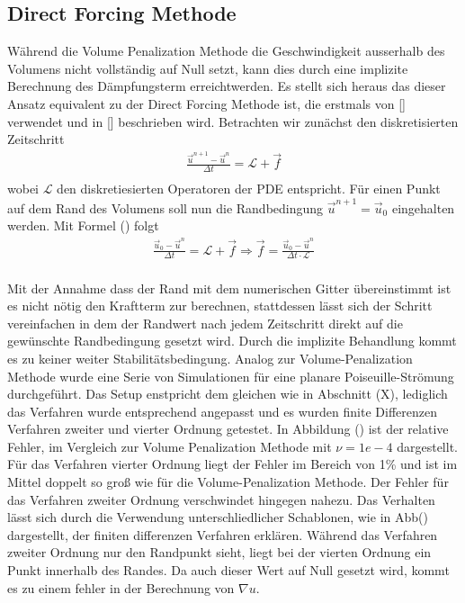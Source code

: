 \subsection{Direct Forcing Methode}
Während die Volume Penalization Methode die Geschwindigkeit ausserhalb des Volumens nicht vollständig auf Null setzt,
 kann dies durch eine implizite Berechnung des Dämpfungsterm erreichtwerden. Es stellt sich heraus das dieser Ansatz equivalent
  zu der Direct Forcing Methode ist, die erstmals von [] verwendet und in [] beschrieben wird.
Betrachten wir zunächst den diskretisierten Zeitschritt
\begin{align}
    \frac{\vec{u}^{n+1} -\vec{u}^n}{\Delta t} = \mathscr{L} + \vec{f}\\
\end{align}
wobei $\mathscr{L}$ den diskretiesierten Operatoren der PDE entspricht.
Für einen Punkt auf dem Rand des Volumens soll nun die Randbedingung $\vec{u}^{n+1} = \vec{u}_0$ eingehalten werden.
Mit Formel () folgt
\begin{align}
    \frac{\vec{u}_0 -\vec{u}^n}{\Delta t} = \mathscr{L} + \vec{f} \Rightarrow \vec{f} = \frac{\vec{u}_0 -\vec{u}^n}{\Delta t\cdot \mathscr{L}}\\
\end{align}

Mit der Annahme dass der Rand mit dem numerischen Gitter übereinstimmt ist es nicht nötig den Kraftterm zur berechnen, stattdessen lässt sich der
Schritt vereinfachen in dem der Randwert nach  jedem Zeitschritt direkt auf die gewünschte Randbedingung gesetzt wird. Durch die
implizite Behandlung kommt es zu keiner weiter Stabilitätsbedingung.
Analog zur Volume-Penalization Methode wurde eine Serie von Simulationen für eine planare Poiseuille-Strömung durchgeführt.
Das Setup enstpricht dem gleichen wie in Abschnitt (X), lediglich das Verfahren wurde entsprechend angepasst und es wurden finite Differenzen Verfahren zweiter und
vierter Ordnung getestet.
In Abbildung () ist der relative Fehler, im Vergleich zur Volume Penalization  Methode mit $\nu=1e-4$ dargestellt.
Für das Verfahren vierter Ordnung liegt der Fehler im Bereich von 1\% und ist im Mittel doppelt so groß wie für die Volume-Penalization Methode.
Der Fehler für das Verfahren zweiter Ordnung verschwindet hingegen nahezu.
Das Verhalten lässt sich durch die Verwendung unterschliedlicher Schablonen, wie in Abb() dargestellt,  der finiten differenzen Verfahren erklären.
Während das Verfahren zweiter Ordnung nur den Randpunkt sieht, liegt bei der vierten Ordnung ein Punkt innerhalb des Randes.
Da auch dieser Wert auf Null gesetzt wird, kommt es zu einem fehler in der Berechnung von $\nabla u$.

